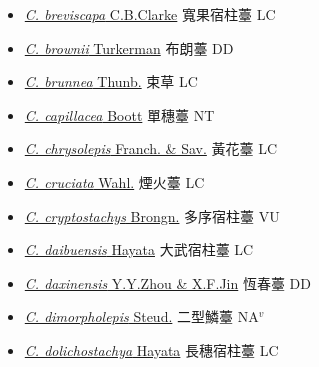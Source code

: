 \begin{itemize}
\begin{itemize}
        \item[] \href{http://www.theplantlist.org/tpl1.1/search?q=Carex+breviscapa}{\textit{C. breviscapa} C.B.Clarke}   寬果宿柱薹 LC
        \item[] \href{http://www.theplantlist.org/tpl1.1/search?q=Carex+brownii}{\textit{C. brownii} Turkerman}   布朗薹 DD
        \item[] \href{http://www.theplantlist.org/tpl1.1/search?q=Carex+brunnea}{\textit{C. brunnea} Thunb.}   束草 LC
        \item[] \href{http://www.theplantlist.org/tpl1.1/search?q=Carex+capillacea}{\textit{C. capillacea} Boott}   單穗薹 NT
        \item[] \href{http://www.theplantlist.org/tpl1.1/search?q=Carex+chrysolepis}{\textit{C. chrysolepis} Franch. \& Sav.}   黃花薹 LC
        \item[] \href{http://www.theplantlist.org/tpl1.1/search?q=Carex+cruciata}{\textit{C. cruciata} Wahl.}   煙火薹 LC
        \item[] \href{http://www.theplantlist.org/tpl1.1/search?q=Carex+cryptostachys}{\textit{C. cryptostachys} Brongn.}   多序宿柱薹 VU
        \item[] \href{http://www.theplantlist.org/tpl1.1/search?q=Carex+daibuensis}{\textit{C. daibuensis} Hayata}     大武宿柱薹 LC
        \item[] \href{http://www.theplantlist.org/tpl1.1/search?q=Carex+daxinensis}{\textit{C. daxinensis} Y.Y.Zhou \& X.F.Jin}   恆春薹 DD
        \item[] \href{http://www.theplantlist.org/tpl1.1/search?q=Carex+dimorpholepis}{\textit{C. dimorpholepis} Steud.}   二型鱗薹 NA$^v$
        \item[] \href{http://www.theplantlist.org/tpl1.1/search?q=Carex+dolichostachya}{\textit{C. dolichostachya} Hayata}   長穗宿柱薹 LC

\end{itemize}
\end{itemize}
